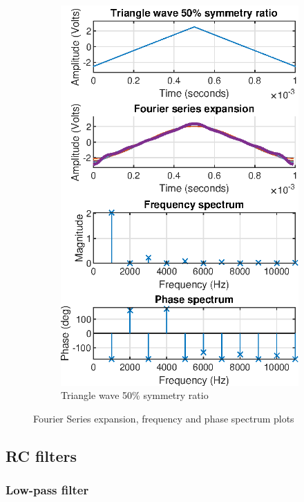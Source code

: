 \documentclass[notitlepage, a4paper, 11pt]{article}
\begin{document}
\begin{figure}[H]
\begin{subfigure}[][][t]{0.23\textwidth}
			\includegraphics[width=\textwidth]{../Matlab/img/tri50}
			\caption{Triangle wave 50\% symmetry ratio}
		\end{subfigure}
		\caption{Fourier Series expansion, frequency and phase spectrum plots}
		\label{fig:pure-signals}
	\end{figure}
	
	\subsection{RC filters}
	\subsubsection{Low-pass filter}
	
\end{document}
